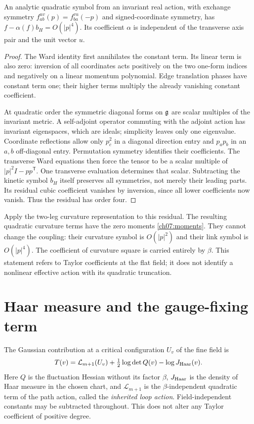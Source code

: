 \begin{lemma}\label{ch07:unique}
An analytic quadratic symbol from an invariant real action, with
exchange symmetry $f_{ab}^{uv}(p)=f_{ba}^{vu}(-p)$ and signed-coordinate symmetry, has
$f-\alpha(f)b_H=O(|p|^4)$. Its coefficient $\alpha$ is independent
of the transverse axis pair and the unit vector $u$.
\end{lemma}

\begin{proof}
The Ward identity first annihilates the constant term. Its linear term is
also zero: inversion of all coordinates acts positively on the two
one-form indices and negatively on a linear momentum polynomial.
Edge translation phases have constant term one; their higher terms
multiply the already vanishing constant coefficient.

At quadratic order the symmetric diagonal forms on $\mathfrak g$ are scalar
multiples of the invariant metric. A self-adjoint operator commuting
with the adjoint action has invariant eigenspaces, which are ideals;
simplicity leaves only one eigenvalue. Coordinate reflections allow
only $p_c^2$ in a diagonal direction entry and $p_ap_b$ in an
$a,b$ off-diagonal entry. Permutation symmetry identifies their
coefficients. The transverse Ward equations then force the tensor to
be a scalar multiple of $|p|^2I-pp^{\mathsf T}$.
One transverse evaluation determines that scalar. Subtracting the
kinetic symbol $b_H$ itself preserves all symmetries, not merely their leading
parts. Its residual cubic coefficient vanishes by inversion, since all
lower coefficients now vanish. Thus the residual has order four.
\end{proof}

Apply the two-leg curvature representation to this residual. The
resulting quadratic curvature terms have the zero moments
\eqref{ch07:moments}. They cannot change the coupling: their curvature
symbol is $O(|p|^2)$ and their link symbol is $O(|p|^4)$.
The coefficient of curvature square is carried entirely by $\beta$.
This statement refers to Taylor coefficients at the flat field; it does
not identify a nonlinear effective action with its quadratic truncation.

\section{Haar measure and the gauge-fixing term}\label{ch07:completion}

The Gaussian contribution at a critical configuration $U_v$ of the fine field is
\begin{equation}\label{ch07:thermal}
 T(v)=\mathcal L_{m+1}(U_v)+\tfrac12\log\det Q(v)-\log J_{\rm Haar}(v).
\end{equation}
Here $Q$ is the fluctuation Hessian without its factor $\beta$,
$J_{\rm Haar}$ is the density of Haar measure in the chosen chart, and
$\mathcal L_{m+1}$ is the $\beta$-independent quadratic term of the path action, called the \emph{inherited loop action}.
Field-independent constants may be subtracted throughout. This does
not alter any Taylor coefficient of positive degree.

